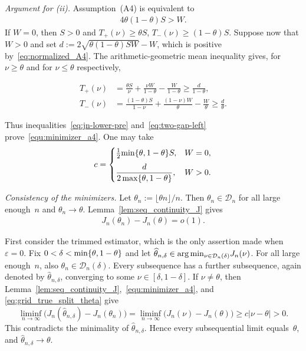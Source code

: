 \documentclass[10pt, letterpaper]{amsart}
\newif\ifwidedisplays
\def\min{{\rm min}}
\begin{document}
\medskip
\noindent\emph{Argument for (ii).}
Assumption~(A4) is equivalent to
\begin{align}\label{eq:normalized_A4}
4\theta(1-\theta)S>W.
\end{align}
If $W=0$, then $S>0$ and $T_+(\nu)\geq\theta S$, $T_-(\nu)\geq(1-\theta)S$.
Suppose now that $W>0$ and set  $d:=2\sqrt{\theta(1-\theta)SW}-W$, which is positive by~\eqref{eq:normalized_A4}.
The arithmetic-geometric mean inequality gives, for $\nu\geq\theta$ and for $\nu\leq\theta$ respectively,
\ifwidedisplays
\[
T_+(\nu)
=\frac{\theta S}{\nu}+\frac{\nu W}{1-\theta}-\frac{W}{1-\theta}
\geq\frac{d}{1-\theta},
\qquad
T_-(\nu)
=\frac{(1-\theta)S}{1-\nu}+\frac{(1-\nu)W}{\theta}-\frac{W}{\theta}
\geq\frac{d}{\theta}.
\]
\else
\begin{align*}
T_+(\nu)
&=\frac{\theta S}{\nu}+\frac{\nu W}{1-\theta}-\frac{W}{1-\theta}
\geq\frac{d}{1-\theta},\\
T_-(\nu)
&=\frac{(1-\theta)S}{1-\nu}+\frac{(1-\nu)W}{\theta}-\frac{W}{\theta}
\geq\frac{d}{\theta}.
\end{align*}
\fi
Thus inequalities~\eqref{eq:jn-lower-pre} and~\eqref{eq:two-gap-left}
prove~\eqref{equ:minimizer_a4}. One may take
\begin{align}\label{eq:const_global}
c=
\begin{cases}
\frac12\min\{\theta,1-\theta\}S,&W=0,\\[2mm]
\dfrac{d}{2\max\{\theta,1-\theta\}},&W>0.
\end{cases}
\end{align}

\medskip
\noindent\emph{Consistency of the minimizers.}
Let $\theta_n:=\lfloor \theta n\rfloor/n$. Then
$\theta_n\in\mathcal D_n$ for all large enough~$n$ and
$\theta_n\to\theta$. Lemma~\ref{lem:seq_continuity_J} gives
\begin{align}\label{eq:grid_true_split_theta}
J_n(\theta_n)-J_n(\theta)=o(1).
\end{align}

First consider the trimmed estimator, which is the only assertion made when
$\varepsilon=0$. Fix $0<\delta<\min\{\theta,1-\theta\}$ and let $\widehat\theta_{n,\delta}\in\arg\min_{\nu\in\mathcal D_n(\delta)}J_n(\nu)$.
For all large enough~$n$, also $\theta_n\in\mathcal D_n(\delta)$. Every
subsequence has a further subsequence, again denoted by
$\widehat\theta_{n,\delta}$, converging to some
$\nu\in[\delta,1-\delta]$. If $\nu\neq\theta$, then
Lemma~\ref{lem:seq_continuity_J},~\eqref{equ:minimizer_a4}, and
\eqref{eq:grid_true_split_theta} give
\[
\liminf_{n\to\infty}
\bigl(J_n(\widehat\theta_{n,\delta})-J_n(\theta_n)\bigr)
=\liminf_{n\to\infty}
\bigl(J_n(\nu)-J_n(\theta)\bigr)
\geq c|\nu-\theta|>0.
\]
This contradicts the minimality of $\widehat\theta_{n,\delta}$. Hence every
subsequential limit equals~$\theta$, and
$\widehat\theta_{n,\delta}\to\theta$.
\end{document}
